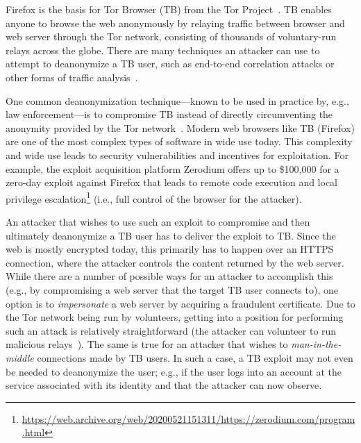 Firefox is the basis for Tor Browser (TB) from the Tor Project~\cite{tor}. TB
enables anyone to browse the web anonymously by relaying traffic between browser
and web server through the Tor network, consisting of thousands of voluntary-run
relays across the globe. There are many techniques an attacker can use to
attempt to deanonymize a TB user, such as end-to-end correlation attacks or
other forms of traffic analysis~\cite{tor,FIXME}. 

One common deanonymization technique---known to be used in practice by, e.g., law
enforcement---is to compromise TB instead of directly circumventing the anonymity
provided by the Tor network~\cite{FIXME}. Modern web browsers like TB (Firefox)
are one of the most complex types of software in wide use today. This complexity
and wide use leads to security vulnerabilities and incentives for exploitation.
For example, the exploit acquisition platform Zerodium offers up to \$100,000
for a zero-day exploit against Firefox that leads to remote code execution and
local privilege
escalation\footnote{\url{https://web.archive.org/web/20200521151311/https://zerodium.com/program.html}}
(i.e., full control of the browser for the attacker).

An attacker that wishes to use such an exploit to compromise and then ultimately
deanonymize a TB user has to deliver the exploit to TB\@. Since the web is mostly
encrypted today, this primarily has to happen over an HTTPS connection, where the
attacker controls the content returned by the web server. While there are a
number of possible ways for an attacker to accomplish this (e.g., by
compromising a web server that the target TB user connects to), one option is to
\emph{impersonate} a web server by acquiring a fraudulent certificate. Due to the
Tor network being run by volunteers, getting into a position for performing such
an attack is relatively straightforward (the attacker can volunteer to run
malicious relays~\cite{spoiled-onions}). The same is true for an attacker that
wishes to \emph{man-in-the-middle} connections made by TB users. In such a case,
a TB exploit may not even be needed to deanonymize the user; e.g., if the user
logs into an account at the service associated with its identity 
and that the attacker can now observe.

